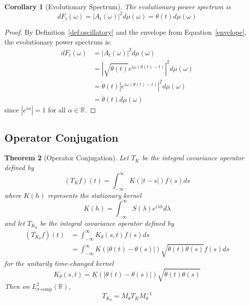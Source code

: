 \documentclass{article}
\newtheorem{theorem}{Theorem}[section]
\newtheorem{corollary}[theorem]{Corollary}
\begin{document}
\begin{corollary}[Evolutionary Spectrum]\label{cor:evolving_spec}
The evolutionary power spectrum is
\begin{equation}
\label{eq:evolutionary_spec}
dF_t(\omega) = |A_t(\omega)|^2 d\mu(\omega) = \dot{\theta}(t) d\mu(\omega)
\end{equation}
\end{corollary}
\begin{proof}
By Definition~\ref{def:oscillatory} and the envelope from Equation~\eqref{envelope}, the evolutionary power spectrum is:
\begin{align}
dF_t(\omega) &= |A_t(\omega)|^2 d\mu(\omega) \\
&= \left|\sqrt{\dot{\theta}(t)} e^{i\omega(\theta(t) - t)}\right|^2 d\mu(\omega) \\
&= \dot{\theta}(t) |e^{i\omega(\theta(t) - t)}|^2 d\mu(\omega) \\
&= \dot{\theta}(t) d\mu(\omega)
\end{align}
since $|e^{i\alpha}| = 1$ for all $\alpha \in \mathbb{R}$.
\end{proof}

\subsection{Operator Conjugation}

\begin{theorem}[Operator Conjugation]\label{thm:operator_conjugation}
Let $T_K$ be the integral covariance operator defined by
\begin{equation}
\label{eq:integral_op_original}
(T_K f)(t) = \int_{-\infty}^{\infty} K(|t - s|) f(s) ds
\end{equation}
where $K(h)$ represents the stationary kernel
\begin{equation}
K(h) = \int_{-\infty}^{\infty} S(\lambda) e^{i\lambda h} d\lambda
\end{equation}
and let $T_{K_{\theta}}$ be the integral covariance operator defined by
\begin{equation}
\label{eq:integral_op_transformed}
\begin{aligned}
(T_{K_{\theta}} f)(t) &= \int_{-\infty}^{\infty} K_{\theta}(s,t) f(s) ds \\
&= \int_{-\infty}^{\infty} K(|\theta(t) - \theta(s)|) \sqrt{\dot{\theta}(t) \dot{\theta}(s)} f(s) ds
\end{aligned}
\end{equation}
for the unitarily time-changed kernel
\begin{equation}
K_{\theta}(s,t) = K(|\theta(t) - \theta(s)|) \sqrt{\dot{\theta}(t) \dot{\theta}(s)}
\end{equation}
Then on $L^2_{\sigma\text{-comp}}(\mathbb{R})$,
\begin{equation}
\label{eq:conjugation}
T_{K_{\theta}} = M_{\theta} T_K M_{\theta}^{-1}
\end{equation}
\end{theorem}
\end{document}
